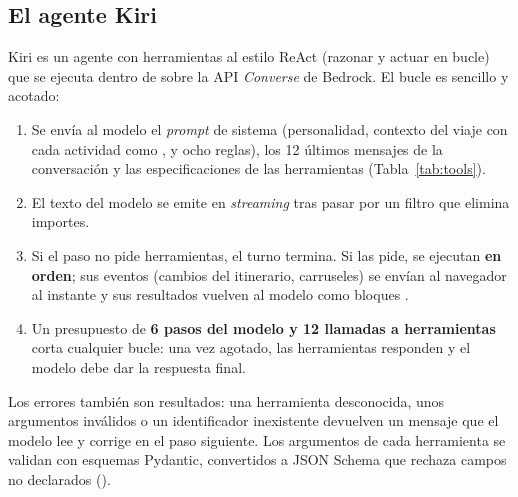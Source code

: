 \subsection{El agente Kiri}\label{sec:agente}

Kiri es un agente con herramientas al estilo ReAct (razonar y actuar en bucle)~\cite{yao2023react} que se ejecuta dentro de
 sobre la API \emph{Converse} de Bedrock. El bucle es sencillo y
acotado:
\begin{enumerate}
  \item Se envía al modelo el \emph{prompt} de sistema (personalidad, contexto del viaje con cada
        actividad como , y ocho reglas), los 12 últimos mensajes de la conversación y las
        especificaciones de las herramientas (Tabla~\ref{tab:tools}).
  \item El texto del modelo se emite en \emph{streaming} tras pasar por un filtro que elimina importes.
  \item Si el paso no pide herramientas, el turno termina. Si las pide, se ejecutan
        \textbf{en orden}; sus eventos (cambios del itinerario, carruseles) se envían al navegador
        al instante y sus resultados vuelven al modelo como bloques .
  \item Un presupuesto de \textbf{6 pasos del modelo y 12 llamadas a herramientas} corta cualquier bucle: una vez agotado, las
        herramientas responden  y el modelo debe dar la respuesta final.
\end{enumerate}
Los errores también son resultados: una herramienta desconocida, unos argumentos inválidos o un
identificador inexistente devuelven un mensaje que el modelo lee y corrige en el paso siguiente.
Los argumentos de cada herramienta se validan con esquemas Pydantic, convertidos a JSON Schema que
rechaza campos no declarados ().

